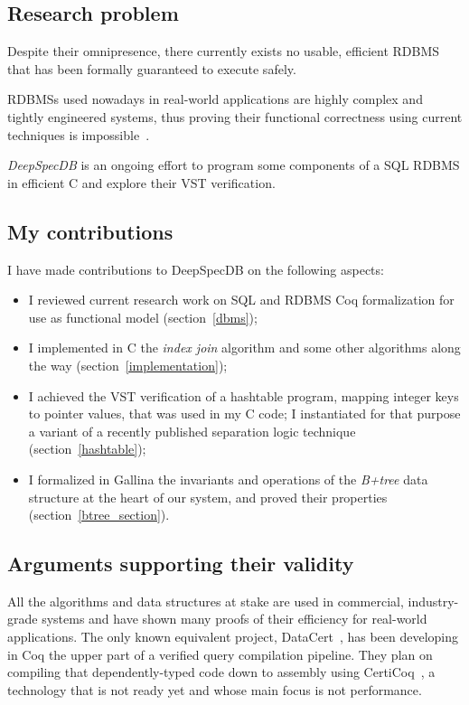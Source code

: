 \documentclass[11pt]{article}
\begin{document}
\subsection*{Research problem}

Despite their omnipresence, there currently exists no usable, efficient RDBMS that has been formally guaranteed to execute safely.

RDBMSs used nowadays in real-world applications are highly complex and tightly engineered systems,
thus proving their functional correctness using current techniques is impossible~\cite{DCWS}.%

\emph{DeepSpecDB} is an ongoing effort to program some components of a SQL RDBMS in efficient C and explore their VST verification.

\subsection*{My contributions}

I have made contributions to DeepSpecDB on the following aspects:
\begin{itemize}[itemsep=1pt, topsep=0pt]
\renewcommand\labelitemi{--}
\item I reviewed current research work on SQL and RDBMS Coq formalization for use as functional model (section~\ref{dbms});
\item I implemented in C the \emph{index join} algorithm and some other algorithms along the way (section~\ref{implementation});
\item I achieved the VST verification of a hashtable program, mapping integer keys to pointer values, that was used in my C code;
  I instantiated for that purpose a variant of a recently published separation logic technique (section~\ref{hashtable});
\item I formalized in Gallina the invariants and operations of the \emph{B+tree} data structure at the heart of our system, and proved their properties (section~\ref{btree_section}).
\end{itemize}

\subsection*{Arguments supporting their validity}

All the algorithms and data structures at stake are used in commercial, industry-grade systems and have shown many proofs of their efficiency for real-world applications.
The only known equivalent project, DataCert~\cite{DCWS}, has been developing in Coq the upper part of a verified query compilation pipeline.
They plan on compiling that dependently-typed code down to assembly using CertiCoq~\cite{CVCC}, a technology that is not ready yet and whose main focus is not performance.
\end{document}
